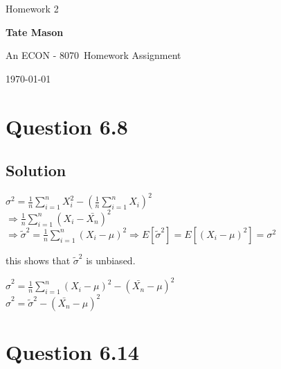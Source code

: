 \documentclass[10pt, a4paper]{article}
\newcommand\course{ECON - 8070}                            %
\newcommand\hwnumber{ 2}                                 %
\newcommand\Information{Tate Mason}                        %
\begin{document}
  \begin{titlepage}
    \begin{center}
      \vspace*{3cm}
            
        \vspace{1cm}
        \huge
        Homework \hwnumber
            
        \vspace{1.5cm}
        \Large
            
        \textbf{\Information}                      %
            
        \vfill
        
        An \course \ Homework Assignment
            
        \vspace{1cm}
        \Large
        
        \today
            
    \end{center}
  \end{titlepage}

  \newpage

  \section{Question 6.8}
    \subsection{Solution}

    \begin{center}
      $\sigma^2=\frac{1}{n}\sum^n_{i=1}X_i^2-(\frac{1}{n}\sum^n_{i=1}X_i)^2$ \\
      $\Rightarrow \frac{1}{n}\sum^n_{i=1}(X_i-\bar{X_n})^2$ \\
      $\Rightarrow \tilde{\sigma}^2=\frac{1}{n}\sum^n_{i=1}(X_i-\mu)^2 \Rightarrow E[\tilde{\sigma}^2]=E[(X_i-\mu)^2]=\sigma^2$
    \end{center}
    this shows that $\tilde{\sigma}^2$ is unbiased.

    \begin{center}
      $\hat{\sigma}^2=\frac{1}{n}\sum^n_{i=1}(X_i-\mu)^2-(\bar{X_n}-\mu)^2$ \\
      $\hat{\sigma}^2=\tilde{\sigma}^2-(\bar{X_n}-\mu)^2$
    \end{center}

  \section{Question 6.14}
\end{document}
